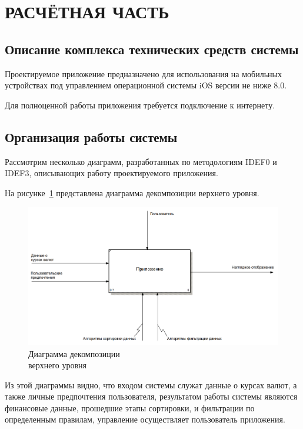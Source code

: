 \section[Расчётная часть]{РАСЧЁТНАЯ ЧАСТЬ}

\subsection{Описание комплекса технических средств системы}

Проектируемое приложение предназначено для использования
на мобильных устройствах под управлением операционной системы iOS
версии не ниже 8.0.

Для полноценной работы приложения требуется подключение к интернету.

\subsection{Организация работы системы}

Рассмотрим несколько диаграмм, разработанных по методологиям IDEF0 и IDEF3,
описывающих работу проектируемого приложения.


На рисунке~\ref{fig:idef0} представлена диаграмма декомпозиции
верхнего уровня.

\begin{figure}[h!]
  \centering
  \includegraphics[width=150mm]{pic/IDEF0}
  \caption{Диаграмма декомпозиции \\ верхнего уровня}
  \label{fig:idef0}
\end{figure}

Из этой диаграммы видно, что входом системы служат данные о курсах валют,
а также личные предпочтения пользователя,
результатом работы системы являются финансовые данные,
прошедшие этапы сортировки, и фильтрации по определенным правилам,
управление осуществляет пользователь приложения.


